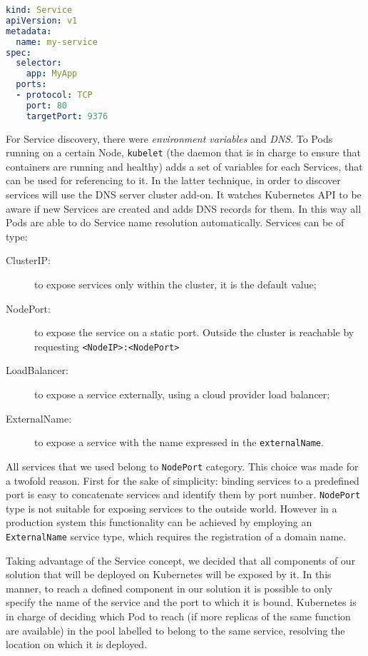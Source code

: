 \begin{lstlisting}[caption={Example of Service definition},
                   captionpos=b, language=yaml, label=chap:impl:lst:srv]
kind: Service
apiVersion: v1
metadata:
  name: my-service
spec:
  selector:
    app: MyApp
  ports:
  - protocol: TCP
    port: 80
    targetPort: 9376
\end{lstlisting}

For Service discovery, there were \emph{environment variables} and \emph{DNS}.
To Pods running on a certain Node, \texttt{kubelet} (the daemon that is in
charge to ensure that containers are running and healthy) adds a set of
variables for each Services, that can be used for referencing to it. In the
latter technique, in order to discover services will use the DNS server
cluster
add-on. It watches Kubernetes API to be aware if new Services are created and adds
DNS records for them. In this way all Pods are able to do Service name
resolution automatically. Services can be of type:
\begin{description}
\item[ClusterIP:] to expose services only within the cluster, it is the default
value;
\item[NodePort:] to expose the service on a static port. Outside the cluster is
reachable by requesting \verb!<NodeIP>:<NodePort>!
\item[LoadBalancer:] to expose a service externally, using a cloud provider
load balancer;
\item[ExternalName:] to expose a service with the name expressed in the 
\texttt{externalName}.
\end{description}

All services that we used belong to \texttt{NodePort} category. This choice was
made for a twofold reason. First for the sake of simplicity: binding services to
a predefined port is easy to concatenate services and identify them by port
number.
\texttt{NodePort} type is not suitable for exposing services to the outside
world. However in a production system this functionality can be achieved by
employing an \texttt{ExternalName} service type, which requires the registration
of a domain name.

Taking advantage of the Service concept, we decided that all components of our
solution that
will be deployed on Kubernetes will be exposed by it. In this manner, to
reach a defined component in our solution it is possible to only specify the
name of the service and the port to which it is bound. Kubernetes is in charge
of deciding which Pod to reach (if more replicas of the same function are
available) in the pool labelled to belong to the same service, resolving the
location on which it is deployed.

